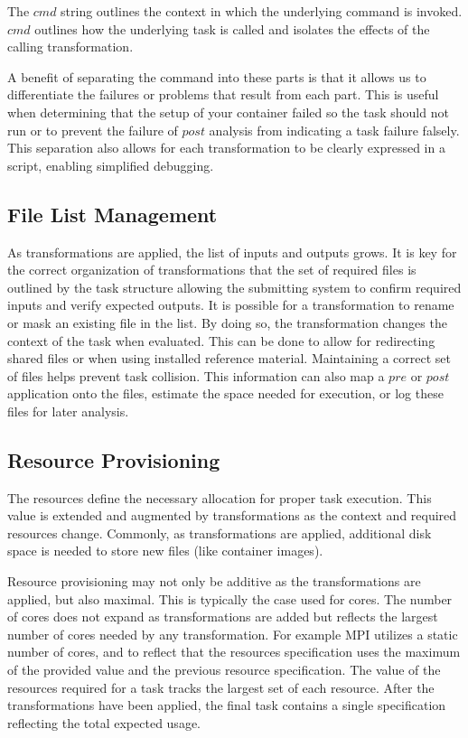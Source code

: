 \documentclass[conference]{IEEEtran}
\begin{document}
The ${cmd}$ string outlines the context in which
the underlying command is invoked.
${cmd}$ outlines how the underlying task is called
and isolates the effects of the calling transformation.

A benefit of separating the command into these parts
is that it allows us to differentiate the failures or 
problems that result from each part.
This is useful when determining that the setup of 
your container failed so the task should not run 
or to prevent the failure of $post$ analysis from 
indicating a task failure falsely.
This separation also allows for each transformation
to be clearly expressed in a script, 
enabling simplified debugging.



\subsection{File List Management}

As transformations are applied, the list of inputs and outputs grows. 
It is key for the correct organization of transformations that the 
set of required files is outlined by the task structure
allowing the submitting system to confirm required inputs
and verify expected outputs.
It is possible for a transformation to rename or mask an existing 
file in the list.
By doing so, the transformation changes the 
context of the task when evaluated.
This can be done to allow for redirecting shared files or when using
installed reference material.
Maintaining a correct set of files helps
prevent task collision.
This information can also map a
$pre$ or $post$ application onto the files, 
estimate the space needed for execution,
or log these files for later analysis.


\subsection{Resource Provisioning}

The resources define the necessary allocation for proper task execution. 
This value is extended and augmented by transformations 
as the context and required resources change.
Commonly, as transformations are applied, 
additional disk space is needed to store new files
(like container images). 

Resource provisioning may not only be additive 
as the transformations are applied,
but also maximal.
This is typically the case used for cores.
The number of cores does not expand as
transformations are added but reflects
the largest number of cores needed by any
transformation.
For example MPI utilizes a static number of cores, 
and to reflect that the resources specification
uses the maximum of the provided value and the previous
resource specification. 
The value of the resources required for a task 
tracks the largest set of each resource.
After the transformations have been applied, 
the final task contains a single specification 
reflecting the total expected usage.
\end{document}

